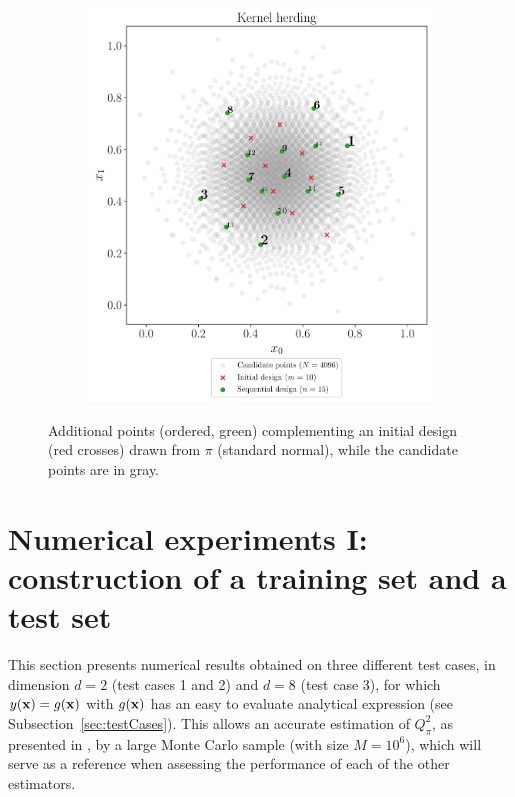 \begin{figure}
\begin{subfigure}[b]{0.48\linewidth}
  \end{subfigure}
  \\
  \begin{subfigure}[b]{0.48\linewidth}
    \centering
    \includegraphics[width=\textwidth]{./part2/figures/SIS/normal2D_KH.pdf}
  \end{subfigure}
  \caption{Additional points (ordered, green) complementing an initial design (red crosses) drawn from $\pi$ (standard normal), while the candidate points are in gray.}
  \label{fig:normal_validation_designs}
\end{figure}   





\section{Numerical experiments I: construction of a training set and a test set}\label{sec:val_res1}
This section presents numerical results obtained on three different test cases, in dimension $d=2$ (test cases 1 and 2) and $d=8$ (test case 3), for which $y({\bf x})=g({\bf x})$ with $g({\bf x})$ has an easy to evaluate analytical expression (see Subsection~\ref{sec:testCases}). 
This allows an accurate estimation of $Q_\pi^2$, as presented in , by a large Monte Carlo sample (with size $M=10^6$), which will serve as a reference when assessing the performance of each of the other estimators. 

